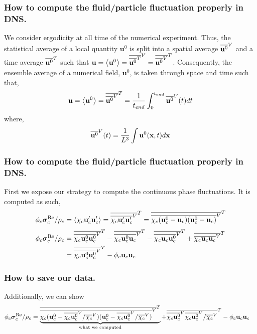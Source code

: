 \documentclass{sintefbeamer}
\begin{document}
\begin{frame}
  \frametitle{How to compute the fluid/particle fluctuation properly in DNS. }


We consider ergodicity at all time of the numerical experiment.
Thus, the statistical average of a local quantity $\textbf{u}^0$ is split into a spatial average $\overline{\textbf{u}^0}^V$ and a time average $\overline{\textbf{u}^0}^T$ such that $\textbf{u} = \left<\textbf{u}^0\right> = \overline{\overline{\textbf{u}^0}^T}^V=\overline{\overline{\textbf{u}^0}^V}^T$.
Consequently, the ensemble average of a numerical field, $\textbf{u}^0$, is taken through space and time such that,
\begin{equation}
    \textbf{u}
    = \left<\textbf{u}^0\right>
    = \overline{\overline{\textbf{u}^0}^V}^T
    = \frac{1}{t_{end}}\int_{0}^{t_{end}} 
    \overline{\textbf{u}^0}^V(t) dt
\end{equation}
where, 
\begin{equation}
    \overline{\textbf{u}^0}^V(t)
    = \frac{1}{L^3}\int 
    \textbf{u}^0(\textbf{x},t) d\textbf{x}
\end{equation}
  
\end{frame}
\begin{frame}
  \frametitle{How to compute the fluid/particle fluctuation properly in DNS. }
  First we expose our strategy to compute the continuous phase fluctuations. 
  It is computed as such, 
  \begin{equation}
      \phi_c \bm{\sigma}^{\text{Re}}_c /\rho_c
      = \left<\chi_c \textbf{u}_c' \textbf{u}_c'\right>
      = \overline{\overline{\chi_c \textbf{u}_c' \textbf{u}_c'}^V}^T
      = \overline{\overline{\chi_c (\textbf{u}_c^0 -\textbf{u}_c ) (\textbf{u}_c^0 -\textbf{u}_c)}^V}^T
  \end{equation}
\begin{align*}
  \phi_c \bm{\sigma}^{\text{Re}}_c /\rho_c
    &= \overline{\overline{\chi_c \textbf{u}_c^0 \textbf{u}_c^0}^V}^T
    - \overline{\overline{\chi_c \textbf{u}_c^0 \textbf{u}_c}^V}^T
    - \overline{\overline{\chi_c \textbf{u}_c \textbf{u}_c^0}^V}^T
    + \overline{\overline{\chi_c \textbf{u}_c \textbf{u}_c}^V}^T\\
    &= \overline{\overline{\chi_c \textbf{u}_c^0 \textbf{u}_c^0}^V}^T
    -  \phi_c  \textbf{u}_c \textbf{u}_c 
\end{align*}
  
\end{frame}
\begin{frame}
  \frametitle{How to save our data. }
 Additionally, we can show
 \begin{align*}
  \phi_c \bm{\sigma}^{\text{Re}}_c /\rho_c
  &= 
  \underbrace{\overline{\overline{\chi_c (\textbf{u}_c^0 -\overline{\chi_c\textbf{u}_c^0}^V / \overline{\chi_c}^V ) (\textbf{u}_c^0 -\overline{\chi_c\textbf{u}_c^0}^V / \overline{\chi_c}^V )}^V}^T}_{\text{what we computed}}
  + \overline{\overline{\chi_c \textbf{u}_c^0}^V\overline{\chi_c\textbf{u}_c^0}^V / \overline{\chi_c}^V}^T
  -  \phi_c  \textbf{u}_c \textbf{u}_c 
\end{align*}
  
\end{frame}
\end{document}

